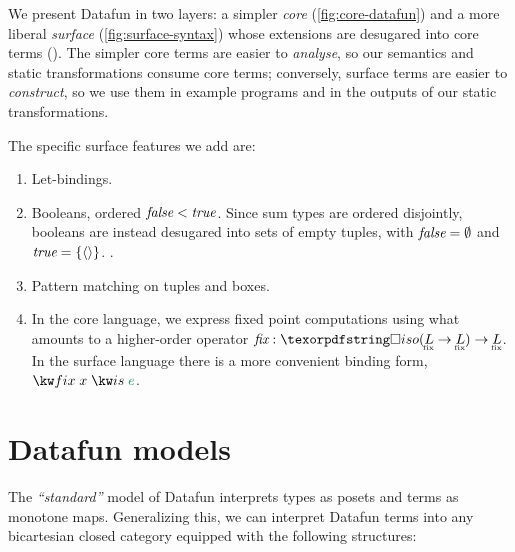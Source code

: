 We present Datafun in two layers: a simpler \emph{core}
(\cref{fig:core-datafun}) and a more liberal \emph{surface}
(\cref{fig:surface-syntax}) whose extensions are desugared into core terms
().
%
The simpler core terms are easier to \emph{analyse}, so our semantics and static
transformations consume core terms; conversely, surface terms are easier to
\emph{construct}, so we use them in example programs and in the outputs of our
static transformations.

The specific surface features we add are:
\begin{enumerate}
\item Let-bindings.

\item Booleans, ordered $\text{\itshape false} < \text{\itshape true}$. Since sum types are ordered
  disjointly, booleans are instead desugared into sets of empty tuples, with
  $\text{\itshape false} = \emptyset$ and $\text{\itshape true} = \{{\langle{}\rangle}\}$. .

\item Pattern matching on tuples and boxes. 


\item In the core language, we express fixed point computations using what
  amounts to a higher-order operator $\prim{fix} : \iso{(\fixt L \to \fixt L)}
  \to \fixt L$. In the surface language there is a more convenient binding form,
  $\efixisd x e$.

\end{enumerate}


\section{Datafun models}
\label{sec:datafun-models}

The \emph{``standard''} model of Datafun interprets types as posets and terms as
monotone maps. Generalizing this, we can interpret Datafun terms into any
bicartesian closed category \catC{} equipped with the following structures:

